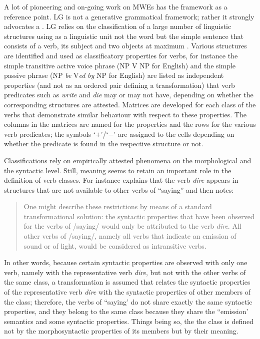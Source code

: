 \documentclass[output=paper]{langsci/langscibook}
\begin{document}
A lot of pioneering and on-going work on MWEs has the  framework as a reference point. LG is not a generative grammatical framework; rather it strongly advocates a . LG relies on the classification of a large number of linguistic structures using as a linguistic unit not the word but the simple sentence that consists of a verb, its subject and two objects at maximum \citep{Gross:82}.  Various structures are identified and used as classificatory properties for verbs, for instance the simple transitive active voice phrase (NP V NP for English) and the simple passive phrase (NP \textit{be} V\textit{ed} \textit{by} NP for English) are listed as independent properties (and not as an ordered pair defining a transformation) that verb predicates such as \textit{write} and \textit{die} may or may not have, depending on whether the corresponding structures are attested.  Matrices are developed for each class of the verbs that demonstrate similar behaviour with respect to these properties. The columns in the matrices are named for the properties and the rows for the various verb predicates; the symbols `$+$'/`$-$' are assigned to the cells depending on whether the predicate is found in the respective structure or not. 

Classifications rely on empirically attested phenomena on the morphological and the syntactic level. Still, meaning seems to retain an important role in the definition of verb classes. For instance   \citet[401--402]{Gross:75-Relation} explains that the verb {\em dire} appears in structures that are not available to other verbs of ``saying'' and then notes: 

\begin{quote}
One might describe these restrictions by means of a standard transformational solution: the syntactic properties that have been observed for the verbs of /saying/ would only be attributed to the verb {\em dire}. All other verbs of /saying/, namely all verbs that indicate an emission of sound or of light, would be considered as intransitive verbs. \citep[402]{Gross:75-Relation}
\end{quote}

In other words, because certain syntactic properties are observed with only one verb, namely with the representative verb \textit{dire}, but not with the other verbs of the same class, a transformation is assumed that relates the syntactic properties of the representative verb \textit{dire} with the syntactic properties of other members of the class; therefore, the verbs of ``saying' do not share exactly the same syntactic properties, and they belong to the same class because they share the ``emission' semantics and some syntactic properties. Things being so, the the class is defined not by the morphosyntactic properties of its members but by their meaning.
\end{document}
